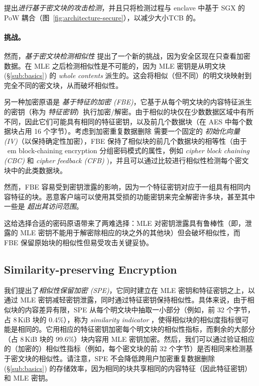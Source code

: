 \sysnameF 提出{\em 进行基于密文块的攻击检测}，并且只将检测过程与 enclave 中基于 SGX 的 PoW 耦合（图~\ref{fig:architecture-secure}），以减少大小TCB 的。


\paragraph{挑战。}
然而，{\em 基于密文块检测相似性} 提出了一个新的挑战，因为安全区现在只查看加密数据。在 MLE 之后检测相似性是不可能的，因为 MLE 密钥是从明文块 (\S\ref{sub:basics}) 的 {\em whole contents} 派生的。这会将相似（但不同）的明文块映射到完全不同的密文块，从而破坏相似性。

另一种加密原语是 {\em 基于特征的加密 (FBE)}，它基于从每个明文块的内容特征派生的密钥（称为 {\em 特征密钥}）执行加密/解密。由于相似的块仅在少数数据区域中有所不同，因此它们可能具有相同的特征密钥，以及前几个数据块（在 AES 中每个数据块占用 16 个字节）。考虑到加密重复数据删除 \cite{douceur02, shah15} 需要一个固定的 {\em 初始化向量 (IV)}（以保持确定性加密），FBE 保持了相似块的前几个数据块的相等性（由于 {\ em block-chaining encryption} 分组密码模式的属性，例如 {\em cipher block chaining (CBC)} 和 {\em cipher feedback (CFB)} \cite{dworkin01})，并且可以通过比较进行相似性检测每个密文块中的此类数据块。


然而，FBE 容易受到密钥泄露的影响，因为一个特征密钥对应于一组具有相同内容特征的块。恶意客户端可以使用其受损的功能密钥来完全解密许多块，甚至其中一些是 {\em 超出其访问范围}。


这给选择合适的密码原语带来了两难选择：MLE 对密钥泄露具有鲁棒性（即，泄露的 MLE 密钥不能用于解密除相应的块之外的其他块）但会破坏相似性，而 FBE 保留原始块的相似性但易受攻击关键妥协。

\subsection{Similarity-preserving Encryption}
\label{sub:spe}

我们提出了{\em 相似性保留加密 (SPE)}，它同时建立在 MLE 密钥和特征密钥之上，以通过 MLE 密钥减轻密钥泄露，同时通过特征密钥保持相似性。具体来说，由于相似块的内容差异有限，SPE 从每个明文块中抽取一小部分（例如，前 32 个字节，占 8\,KiB 块的 0.4\%），称为 {\em similarity indicator} ，使得相似块的相似度指标很可能是相同的。它用相应的特征密钥加密每个明文块的相似性指标，而剩余的大部分（占 8\,KiB 块的 99.6\%）块内容用 MLE 密钥加密。然后，我们可以通过验证相应的（加密的）相似性指标（例如，每个密文块的前 32 个字节）是否相同来检测基于密文块的相似性。请注意，SPE 不会降低跨用户加密重复数据删除 (\S\ref{sub:basics}) 的存储效率，因为相同的块共享相同的内容特征（因此特征密钥）和 MLE 密钥。

